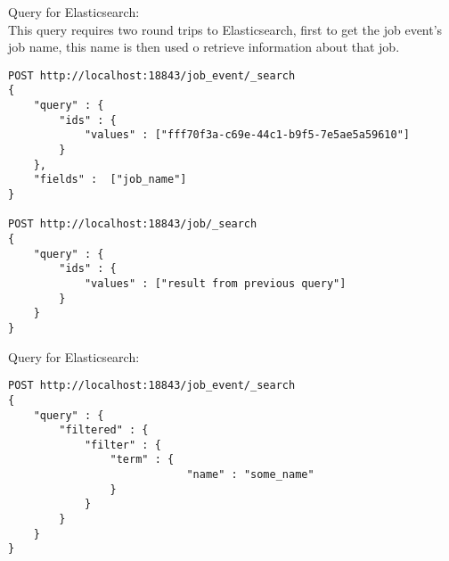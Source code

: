 \label{q:getroottsEs}
Query for Elasticsearch:\\
This query requires two round trips to Elasticsearch, first to get the job event's job name, this name is then used o retrieve information about that job.
\begin{verbatim}
POST http://localhost:18843/job_event/_search
{ 
    "query" : {
        "ids" : { 
            "values" : ["fff70f3a-c69e-44c1-b9f5-7e5ae5a59610"]
        }
    },
    "fields" :  ["job_name"]
}

POST http://localhost:18843/job/_search
{ 
    "query" : {
        "ids" : { 
            "values" : ["result from previous query"]
        }
    }
}
\end{verbatim}


Query for Elasticsearch:
\label{q:gettcbynameEs}
\begin{verbatim}
POST http://localhost:18843/job_event/_search
{
    "query" : {
        "filtered" : {
            "filter" : {
                "term" : {
                            "name" : "some_name"
                }
            }
        }
    }
}
\end{verbatim}

